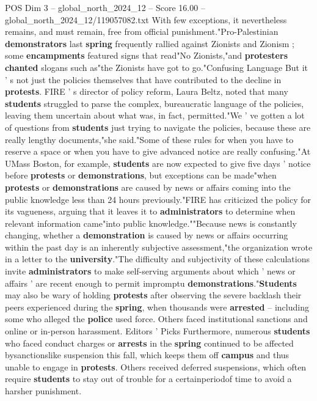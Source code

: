 \begin{textsample}{POS Dim 3 – global\_north\_2024\_12 – Score 16.00 – global\_north\_2024\_12/119057082.txt}
With few exceptions, it nevertheless remains, and must remain, free from official punishment."Pro-Palestinian \textbf{demonstrators} last \textbf{spring} frequently rallied against Zionists and Zionism ; some \textbf{encampments} featured signs that read"No Zionists,"and \textbf{protesters} \textbf{chanted} slogans such as"the Zionists have got to go."Confusing Language But it ' s not just the policies themselves that have contributed to the decline in \textbf{protests}.
FIRE ' s director of policy reform, Laura Beltz, noted that many \textbf{students} struggled to parse the complex, bureaucratic language of the policies, leaving them uncertain about what was, in fact, permitted."We ' ve gotten a lot of questions from \textbf{students} just trying to navigate the policies, because these are really lengthy documents,"she said."Some of these rules for when you have to reserve a space or when you have to give advanced notice are really confusing."At UMass Boston, for example, \textbf{students} are now expected to give five days ' notice before \textbf{protests} or \textbf{demonstrations}, but exceptions can be made"when \textbf{protests} or \textbf{demonstrations} are caused by news or affairs coming into the public knowledge less than 24 hours previously."FIRE has criticized the policy for its vagueness, arguing that it leaves it to \textbf{administrators} to determine when relevant information came"into public knowledge.""Because news is constantly changing, whether a \textbf{demonstration} is caused by news or affairs occurring within the past day is an inherently subjective assessment,"the organization wrote in a letter to the \textbf{university}."The difficulty and subjectivity of these calculations invite \textbf{administrators} to make self-serving arguments about which ' news or affairs ' are recent enough to permit impromptu \textbf{demonstrations}."\textbf{Students} may also be wary of holding \textbf{protests} after observing the severe backlash their peers experienced during the \textbf{spring}, when thousands were \textbf{arrested} -- including some who alleged the \textbf{police} used force.
Others faced institutional sanctions and online or in-person harassment.
Editors ' Picks Furthermore, numerous \textbf{students} who faced conduct charges or \textbf{arrests} in the \textbf{spring} continued to be affected bysanctionslike suspension this fall, which keeps them off \textbf{campus} and thus unable to engage in \textbf{protests}.
Others received deferred suspensions, which often require \textbf{students} to stay out of trouble for a certainperiodof time to avoid a harsher punishment.

\end{textsample}
